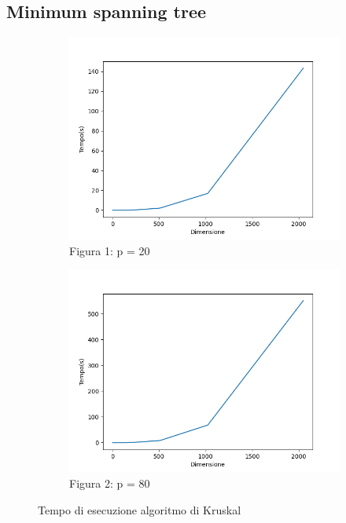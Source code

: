 \documentclass[
]{article}
\begin{document}
\hypertarget{minimum-spanning-tree}{%
\subsection{Minimum spanning tree}\label{minimum-spanning-tree}}

\begin{figure}[h!]
	\centering
	\begin{subfigure}[b]{0.4\linewidth}
		\includegraphics[width=\linewidth]{../img/mst/mst_time_p=20.png}
		\caption{Figura 1: p = 20}
	\end{subfigure}
	\begin{subfigure}[b]{0.4\linewidth}
		\includegraphics[width=\linewidth]{../img/mst/mst_time_p=80.png}
		\caption{Figura 2: p = 80}
	\end{subfigure}
	\caption{Tempo di esecuzione algoritmo di Kruskal}
	\label{fig:MST}
\end{figure}
\end{document}
